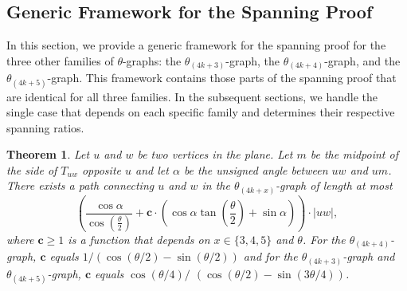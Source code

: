\documentclass[12pt]{article}
\newtheorem{theo}[defin]{Theorem}
\newenvironment{theorem}{\begin{theo} \sl}{\end{theo}}
\newcommand{\graph}[1]{\ensuremath{\theta_{(4 k + #1)}}-graph\xspace}
\newcommand{\canon}[2]{\ensuremath{T_{#1 #2}}}
\newcommand{\const}{\ensuremath{\boldsymbol{c}}\xspace}
\begin{document}
\subsection{Generic Framework for the Spanning Proof}
In this section, we provide a generic framework for the spanning proof for the three other families of $\theta$-graphs: the \graph{3}, the \graph{4}, and the \graph{5}. This framework contains those parts of the spanning proof that are identical for all three families. In the subsequent sections, we handle the single case that depends on each specific family and determines their respective spanning ratios. 

\begin{theorem}
  \label{theo:PathLengthGeneric}
  Let $u$ and $w$ be two vertices in the plane. Let $m$ be the midpoint of the side of \canon{u}{w} opposite $u$ and let $\alpha$ be the unsigned angle between $u w$ and $u m$. There exists a path connecting $u$ and $w$ in the \graph{x} of length at most 
  \[\left( \frac{\cos \alpha}{\cos \left(\frac{\theta}{2}\right)} + \const \cdot \left(\cos \alpha \tan \left(\frac{\theta}{2}\right) + \sin \alpha\right) \right) \cdot |u w|,\] where $\const \geq 1$ is a function that depends on $x \in \{3, 4, 5\}$ and $\theta$. For the \graph{4}, \const equals $1 / (\cos (\theta/2) - \sin (\theta/2))$ and for the \graph{3} and \graph{5}, \const equals $\cos (\theta/4) /$ $(\cos (\theta/2) - \sin (3\theta/4))$.
\end{theorem}
\end{document}
